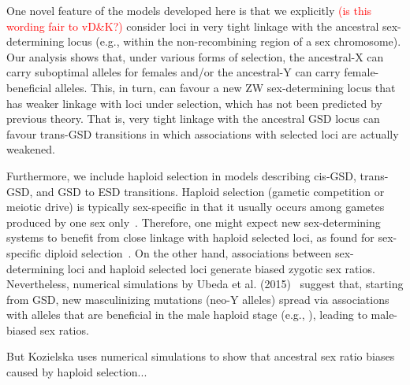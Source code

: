 \documentclass[10pt,letterpaper]{article}
\begin{document}
One novel feature of the models developed here is that we explicitly \textcolor{red}{(is this wording fair to vD\&K?)} consider loci in very tight linkage with the ancestral sex-determining locus (e.g., within the non-recombining region of a sex chromosome). %
Our analysis shows that, under various forms of selection, the ancestral-X can carry suboptimal alleles for females and/or the ancestral-Y can carry female-beneficial alleles. 
This, in turn, can favour a new ZW sex-determining locus that has weaker linkage with loci under selection, which has not been predicted by previous theory. 
That is, very tight linkage with the ancestral GSD locus can favour trans-GSD transitions in which associations with selected loci are actually weakened. 

Furthermore, we include haploid selection in models describing cis-GSD, trans-GSD, and GSD to ESD transitions. 
Haploid selection (gametic competition or meiotic drive) is typically sex-specific in that it usually occurs among gametes produced by one sex only~\cite{Mulcahy:1996ha,JOSEPH:2004haa,Ubeda:2005gw,Lindholm:2016cw}. 
Therefore, one might expect new sex-determining systems to benefit from close linkage with haploid selected loci, as found for sex-specific diploid selection~\cite{vanDoorn:2007eu,vanDoorn:2010hu, Muralidhar2018}. 
On the other hand, associations between sex-determining loci and haploid selected loci generate biased zygotic sex ratios. 
Nevertheless, numerical simulations by Ubeda et al. (2015)~\cite{Ubeda:2015fx} suggest that, starting from GSD, new masculinizing mutations (neo-Y alleles) spread via associations with alleles that are beneficial in the male haploid stage (e.g., \cite{Ubeda:2015fx}), leading to male-biased sex ratios. 

But Kozielska uses numerical simulations to show that ancestral sex ratio biases caused by haploid selection...



\end{document}
